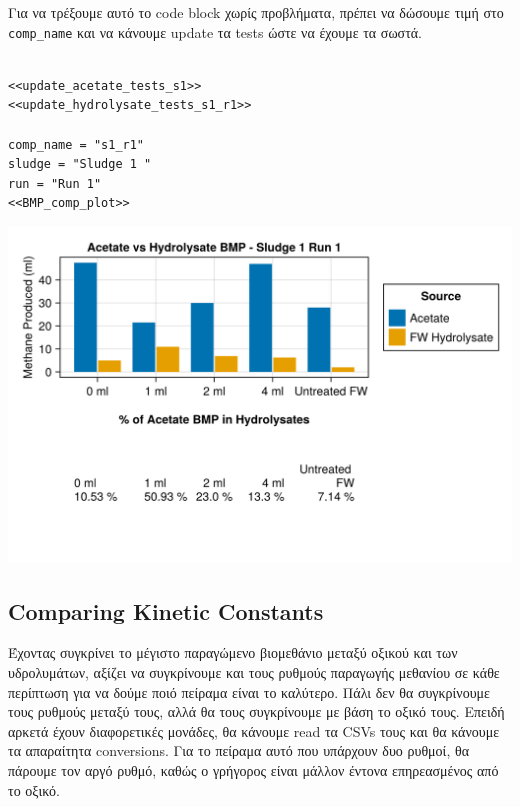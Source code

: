 \documentclass[11pt]{article}
\begin{document}
Για να τρέξουμε αυτό το code block χωρίς προβλήματα, πρέπει να δώσουμε τιμή στο \texttt{comp\_name} και να κάνουμε update τα tests ώστε να έχουμε τα σωστά.
\begin{verbatim}

<<update_acetate_tests_s1>>
<<update_hydrolysate_tests_s1_r1>>

comp_name = "s1_r1"
sludge = "Sludge 1 "
run = "Run 1"
<<BMP_comp_plot>>
\end{verbatim}

\begin{center}
\includegraphics[width=.9\linewidth]{../plots/BMPs/Hydrolyzed FW/acet_vs_hydro_bmp_s1_r1.png}
\end{center}

\subsection{Comparing Kinetic Constants}
\label{sec:org8e93214}
Έχοντας συγκρίνει το μέγιστο παραγώμενο βιομεθάνιο μεταξύ οξικού και των υδρολυμάτων, αξίζει να συγκρίνουμε και τους ρυθμούς παραγωγής μεθανίου σε κάθε περίπτωση για να δούμε ποιό πείραμα είναι το καλύτερο. Πάλι δεν θα συγκρίνουμε τους ρυθμούς μεταξύ τους, αλλά θα τους συγκρίνουμε με βάση το οξικό τους. Επειδή αρκετά έχουν διαφορετικές μονάδες, θα κάνουμε read τα CSVs τους και θα κάνουμε τα απαραίτητα conversions. Για το πείραμα αυτό που υπάρχουν δυο ρυθμοί, θα πάρουμε τον αργό ρυθμό, καθώς ο γρήγορος είναι μάλλον έντονα επηρεασμένος από το οξικό. 
\end{document}
